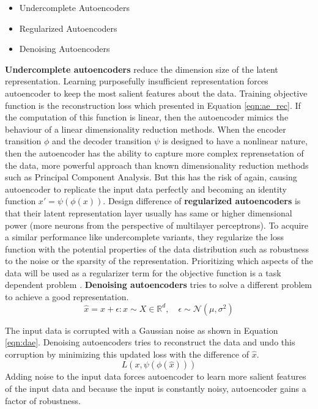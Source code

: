 \begin{itemize}
    \item Undercomplete Autoencoders
    \item Regularized Autoencoders
    \item Denoising Autoencoders
\end{itemize}

\textbf{Undercomplete autoencoders} reduce the dimension size of the latent representation. Learning
purposefully insufficient representation forces autoencoder to keep the most salient features about
the data. Training objective function is the reconstruction loss which presented in Equation
\ref{eqn:ae_rec}. If the computation of this function is linear, then the autoencoder mimics the
behaviour of a linear dimensionality reduction methods. When the encoder transition $\phi$ and the
decoder transition $\psi$ is designed to have a nonlinear nature, then the autoencoder has the
ability to capture more complex reprensetation of the data, more powerful approach than known dimensionality 
reduction methods such as Principal Component Analysis. But this has the risk of again, causing 
autoencoder to replicate the input data perfectly and becoming an identity function $x' = \psi(\phi(x))$. 
 Design difference of \textbf{regularized autoencoders} is that their latent representation layer usually has same 
or higher dimensional power (more neurons from the perspective of multilayer perceptrons). 
To acquire a similar performance like undercomplete variants, they regularize the loss function  
with the potential properties of the data distribution such as robustness to the noise or the 
sparsity of the representation. Prioritizing which aspects of the data will be used as a regularizer 
term for the objective function is a task dependent problem \cite{Goodfellow-et-al-2016}. 
\textbf{Denoising autoencoders} tries to solve a different problem to achieve a good representation. 
\begin{equation}
	\label{eqn:dae}
	\hat{x} = x + \epsilon : x \sim X \in \mathbb{R}^d ,\quad \epsilon \sim \mathcal{N}(\mu, \sigma^2)
\end{equation}

The input data is corrupted with a Gaussian noise as shown in Equation \ref{eqn:dae}. Denoising autoencoders tries to
reconstruct the data and undo this corruption by minimizing this updated loss with the difference of
$\hat{x}$.
$$
L(x, \psi(\phi(\hat{x})))
$$
Adding noise to the input data forces autoencoder to learn more salient features of the input data and because 
the input is constantly noisy, autoencoder gains a factor of robustness.

